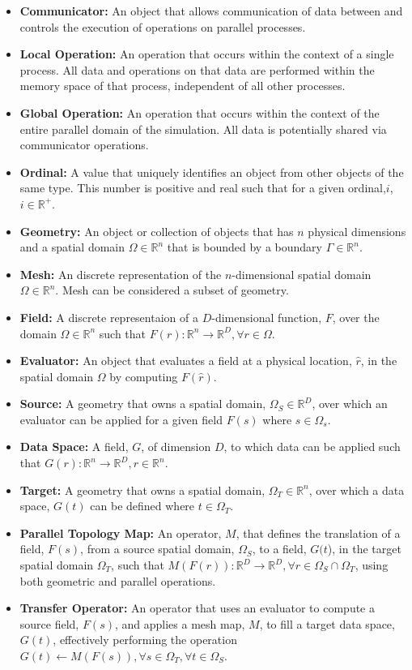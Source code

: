 \documentclass[letterpaper,12pt]{article}
\begin{document}
\begin{itemize}
\item {\bf Communicator:} An object that allows communication of data
  between and controls the execution of operations on parallel
  processes.
\item {\bf Local Operation:} An operation that occurs within the
  context of a single process. All data and operations on that data
  are performed within the memory space of that process, independent
  of all other processes.
\item {\bf Global Operation:} An operation that occurs within the
  context of the entire parallel domain of the simulation. All data is
  potentially shared via communicator operations.
\item {\bf Ordinal:} A value that uniquely identifies an object from
  other objects of the same type. This number is positive and real
  such that for a given ordinal,$i$, $i \in \mathbb{R}^+$.
\item {\bf Geometry:} An object or collection of objects that has $n$
  physical dimensions and a spatial domain $\Omega \in \mathbb{R}^n$
  that is bounded by a boundary $\Gamma \in \mathbb{R}^n$.
\item {\bf Mesh:} An discrete representation of the $n$-dimensional
  spatial domain $\Omega \in \mathbb{R}^n$. Mesh can be considered a
  subset of geometry.
\item {\bf Field:} A discrete representaion of a $D$-dimensional
  function, $F$, over the domain $\Omega \in \mathbb{R}^n$ such that
  $F(r) : \mathbb{R}^n \rightarrow \mathbb{R}^D, \forall r \in
  \Omega$.
\item {\bf Evaluator:} An object that evaluates a field at a physical
  location, $\hat{r}$, in the spatial domain $\Omega$ by computing
  $F(\hat{r})$.
\item {\bf Source:} A geometry that owns a spatial domain, $\Omega_S
  \in \mathbb{R}^D$, over which an evaluator can be applied for a
  given field $F(s)$ where $s \in \Omega_s$.
\item {\bf Data Space:} A field, $G$, of dimension $D$, to which data
  can be applied such that $G(r) : \mathbb{R}^n \rightarrow
  \mathbb{R}^D, r \in \mathbb{R}^n$.
\item {\bf Target:} A geometry that owns a spatial domain, $\Omega_T
  \in \mathbb{R}^n$, over which a data space, $G(t)$ can be defined
  where $t \in \Omega_T$.
\item{ \bf Parallel Topology Map:} An operator, $M$, that defines the
  translation of a field, $F(s)$, from a source spatial domain,
  $\Omega_S$, to a field, $G(t$), in the target spatial domain
  $\Omega_T$, such that $M( F(r) ) : \mathbb{R}^D \rightarrow
  \mathbb{R}^D, \forall r \in \Omega_S \cap \Omega_T$, using both
  geometric and parallel operations.
\item {\bf Transfer Operator:} An operator that uses an evaluator to
  compute a source field, $F(s)$, and applies a mesh map, $M$, to fill
  a target data space, $G(t)$, effectively performing the operation
  $G(t) \leftarrow M( F(s) ), \forall s \in \Omega_T, \forall t \in
  \Omega_S$.
\end{itemize}
\end{document}
